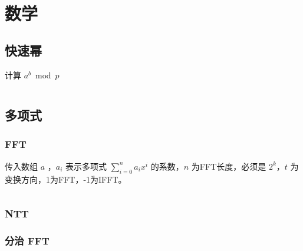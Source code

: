 \documentclass[a4paper, twoside]{article}
\title{\vspace{20cm}\fontsize{50pt}{20pt}\selectfont{Standard Code Library}\\\fontsize{24pt}{\baselineskip}\selectfont{}\vspace{0.1cm}}
\author{\fontsize{15pt}{\baselineskip}\selectfont{XXX University}\vspace{0.2cm}\\\fontsize{12pt}{\baselineskip}\selectfont{WSFcloud}}
\date{}
\begin{document}
\begin{titlepage}
	\selectfont{\color{black}{\maketitle}}
	\thispagestyle{empty}
	\afterpage{\null\thispagestyle{empty}\newpage} %
\end{titlepage}

\pagestyle{plain}
\setcounter{page}{1}
\renewcommand{\contentsname}{\Huge \textbf{目录}}           %
\renewcommand{\cftsecdotsep}{4}                             %
\renewcommand{\cftsubsecdotsep}{4}                          %
\renewcommand{\cftsecfont}{\large\bfseries}                 %
\begin{center}
    \tableofcontents         
\end{center}
\ifodd\value{page}
    \afterpage{\null\thispagestyle{empty}\newpage}          %
\fi

\newpage
\pagestyle{fancy}
\setcounter{page}{1}
\section{数学}
\subsection{快速幂}
计算 $a^b \bmod p$
\inputminted{cpp}{../src/数学/快速幂.cpp}
\subsection{多项式}
    \subsubsection{FFT}
    传入数组 $a$ ，$a_i$ 表示多项式 $\sum\limits_{i=0}^{n} a_ix^i$ 的系数，$n$ 为FFT长度，必须是 $2^k$，$t$ 为变换方向，1为FFT，-1为IFFT。
    \inputminted{cpp}{../src/数学/FFT.cpp}
    
    \subsubsection{NTT}

    \subsubsection{分治 FFT}
\end{document}
